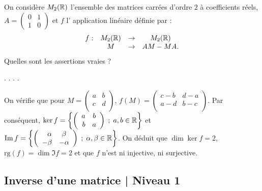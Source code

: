 \begin{question}
On considère $M_2(\mathbb{R})$ l'ensemble des matrices carrées d'ordre $2$ à coefficients réels,  \\
$ A= \left(\begin{array}{rcc}0&1\\1&0 \end{array}\right)$ et 
$f$ l' application linéaire définie par : 
$$\begin{array}{rccc}f:&M_2(\mathbb{R})&\to&M_2(\mathbb{R})\\
& M&\to &AM-MA.  \end{array}$$
Quelles sont les assertions vraies ?
\begin{answers}  
.
.
.
.
\end{answers}
\begin{explanations} On vérifie que pour $M=\left(\begin{array}{rc}
a&b\\c&d\\ \end{array}\right) $, $f(M)=\left(\begin{array}{rc}
c-b&d-a\\a-d&b-c\\ \end{array}\right)$. Par conséquent,
$\ker f = \left\{ \left(\begin{array}{rc}
a&b\\b&a\\ \end{array}\right) \; ; \; a,b \in \mathbb{R} \right \}$ et 
$\mathop{\mathrm{Im}}\nolimits f = \left\{ \left(\begin{array}{rc}
\alpha&\beta\\-\beta&-\alpha\\ 
\end{array}\right) \; ; \; \alpha, \beta \in \mathbb{R}  \right \}$. On  déduit que $\dim \ker f = 2$,  $\mbox{rg} (f)=\dim \Im f = 2$ et que $f$ n'est ni injective, ni surjective.
\end{explanations}
\end{question}

\subsection{Inverse d'une matrice | Niveau 1}

